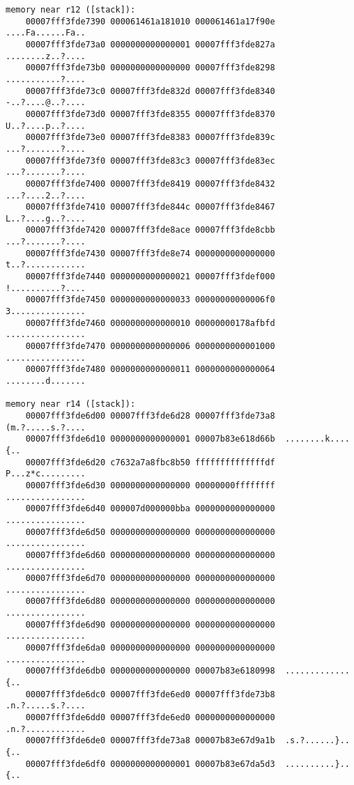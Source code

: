 \begin{lstlisting}
memory near r12 ([stack]):
    00007fff3fde7390 000061461a181010 000061461a17f90e  ....Fa......Fa..
    00007fff3fde73a0 0000000000000001 00007fff3fde827a  ........z..?....
    00007fff3fde73b0 0000000000000000 00007fff3fde8298  ...........?....
    00007fff3fde73c0 00007fff3fde832d 00007fff3fde8340  -..?....@..?....
    00007fff3fde73d0 00007fff3fde8355 00007fff3fde8370  U..?....p..?....
    00007fff3fde73e0 00007fff3fde8383 00007fff3fde839c  ...?.......?....
    00007fff3fde73f0 00007fff3fde83c3 00007fff3fde83ec  ...?.......?....
    00007fff3fde7400 00007fff3fde8419 00007fff3fde8432  ...?....2..?....
    00007fff3fde7410 00007fff3fde844c 00007fff3fde8467  L..?....g..?....
    00007fff3fde7420 00007fff3fde8ace 00007fff3fde8cbb  ...?.......?....
    00007fff3fde7430 00007fff3fde8e74 0000000000000000  t..?............
    00007fff3fde7440 0000000000000021 00007fff3fdef000  !..........?....
    00007fff3fde7450 0000000000000033 00000000000006f0  3...............
    00007fff3fde7460 0000000000000010 00000000178afbfd  ................
    00007fff3fde7470 0000000000000006 0000000000001000  ................
    00007fff3fde7480 0000000000000011 0000000000000064  ........d.......

memory near r14 ([stack]):
    00007fff3fde6d00 00007fff3fde6d28 00007fff3fde73a8  (m.?.....s.?....
    00007fff3fde6d10 0000000000000001 00007b83e618d66b  ........k....{..
    00007fff3fde6d20 c7632a7a8fbc8b50 ffffffffffffffdf  P...z*c.........
    00007fff3fde6d30 0000000000000000 00000000ffffffff  ................
    00007fff3fde6d40 000007d000000bba 0000000000000000  ................
    00007fff3fde6d50 0000000000000000 0000000000000000  ................
    00007fff3fde6d60 0000000000000000 0000000000000000  ................
    00007fff3fde6d70 0000000000000000 0000000000000000  ................
    00007fff3fde6d80 0000000000000000 0000000000000000  ................
    00007fff3fde6d90 0000000000000000 0000000000000000  ................
    00007fff3fde6da0 0000000000000000 0000000000000000  ................
    00007fff3fde6db0 0000000000000000 00007b83e6180998  .............{..
    00007fff3fde6dc0 00007fff3fde6ed0 00007fff3fde73b8  .n.?.....s.?....
    00007fff3fde6dd0 00007fff3fde6ed0 0000000000000000  .n.?............
    00007fff3fde6de0 00007fff3fde73a8 00007b83e67d9a1b  .s.?......}..{..
    00007fff3fde6df0 0000000000000001 00007b83e67da5d3  ..........}..{..


\end{lstlisting}
